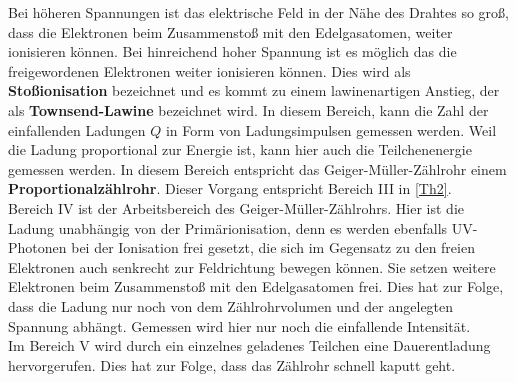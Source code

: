 Bei höheren Spannungen ist das elektrische Feld in der Nähe des Drahtes so groß, dass die Elektronen beim Zusammenstoß 
mit den Edelgasatomen, weiter ionisieren können. Bei hinreichend hoher Spannung ist es möglich das die freigewordenen 
Elektronen weiter ionisieren können. Dies wird als \textbf{Stoßionisation} bezeichnet und es kommt zu einem 
lawinenartigen Anstieg, der als \textbf{Townsend-Lawine} bezeichnet wird. In diesem Bereich, kann die Zahl der 
einfallenden Ladungen $Q$ in Form von Ladungsimpulsen gemessen werden. Weil die Ladung proportional zur Energie ist, 
kann hier auch die Teilchenenergie gemessen werden. In diesem Bereich entspricht das Geiger-Müller-Zählrohr einem 
\textbf{Proportionalzählrohr}. Dieser Vorgang entspricht Bereich III in \cref{Th2}.\\
Bereich IV ist der Arbeitsbereich des Geiger-Müller-Zählrohrs. Hier ist die Ladung unabhängig von der Primärionisation, 
denn es werden ebenfalls UV-Photonen bei der Ionisation frei gesetzt, die sich im Gegensatz zu den freien Elektronen 
auch senkrecht zur Feldrichtung bewegen können. Sie setzen weitere Elektronen beim Zusammenstoß mit den Edelgasatomen 
frei. Dies hat zur Folge, dass 
die Ladung nur noch von dem Zählrohrvolumen und der angelegten Spannung abhängt. Gemessen wird hier nur noch die 
einfallende Intensität.\\
Im Bereich V wird durch ein einzelnes geladenes Teilchen eine Dauerentladung hervorgerufen. Dies hat zur Folge, dass das Zählrohr schnell kaputt geht.
